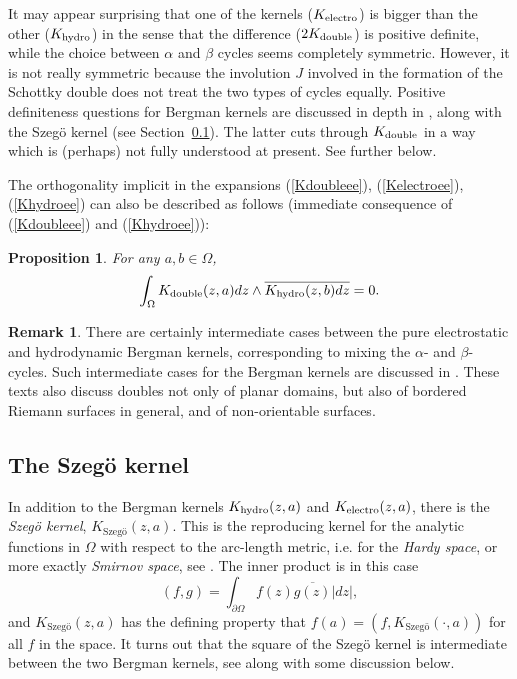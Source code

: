 \documentclass[reqno,12pt]{article}
\theoremstyle{plain}
\newtheorem{proposition}[thm]{Proposition}
\theoremstyle{definition}
\newtheorem{remark}[defn]{Remark}
\numberwithin{equation}{section}
\numberwithin{figure}{section}
\begin{document}
It may appear surprising that one of the kernels ($K_{\rm electro}$) is bigger than the other ($K_{\rm hydro}$)
in the sense that the difference ($2K_{\rm double}$) is positive definite, while the choice between $\alpha$ and
$\beta$ cycles seems completely symmetric. However, it is not really symmetric because the involution $J$
involved in the formation of the Schottky double does not treat the two types of cycles equally.
Positive definiteness questions for Bergman kernels are discussed in depth in \cite{Hejhal-1972}, along with  the
Szeg\"o kernel (see Section~\ref{sec:Szego}). The latter cuts through  $K_{\rm double}$
in a way which is (perhaps) not fully understood at present. See further below. 

The orthogonality implicit in the expansions (\ref{Kdoubleee}), (\ref{Kelectroee}), (\ref{Khydroee})
can also be described as follows (immediate consequence of (\ref{Kdoubleee}) and (\ref{Khydroee})):
\begin{proposition}\label{prop:orthogonal}
For any $a,b\in\Omega$,
$$
\int_\Omega K_{\rm double}(z,a)dz\wedge  \overline{K_{\rm hydro}(z,b)dz}=0.
$$
\end{proposition}

\begin{remark}\label{rem:intermediate}
There are certainly intermediate cases between the pure electrostatic and hydrodynamic Bergman kernels, corresponding
to mixing the $\alpha$- and $\beta$-cycles. Such intermediate cases for the Bergman kernels are discussed in
\cite{Schiffer-Spencer-1954, Ahlfors-Sario-1960}. These texts also discuss doubles not only of planar domains,
but also of bordered Riemann surfaces in general, and of non-orientable surfaces.
\end{remark}


\subsection{The Szeg\"o kernel}\label{sec:Szego}

In addition to the Bergman kernels $K_{\rm hydro}(z,a)$ and $K_{\rm electro}(z,a)$, there is the
{\it Szeg\"o kernel}, $K_\text{Szeg\"o}(z,a)$. This is the reproducing kernel for the analytic functions in $\Omega$
with respect to the arc-length metric, i.e. for the {\it Hardy space}, or more exactly {\it Smirnov space}, 
see \cite{Duren-1970, Bell-2016}. The inner product is in this case
\begin{equation}\label{Smirnov}
(f,g)=\int_{\partial \Omega} f(z)\overline{g(z)}|dz|,
\end{equation}
and $K_\text{Szeg\"o}(z,a)$ has the defining property that $f(a)=(f,K_\text{Szeg\"o}(\cdot ,a))$ for all $f$ in the space. It turns out
that the square of the Szeg\"o kernel is intermediate between the two Bergman kernels, see \cite{Hejhal-1972}
along with some discussion below.
\end{document}
